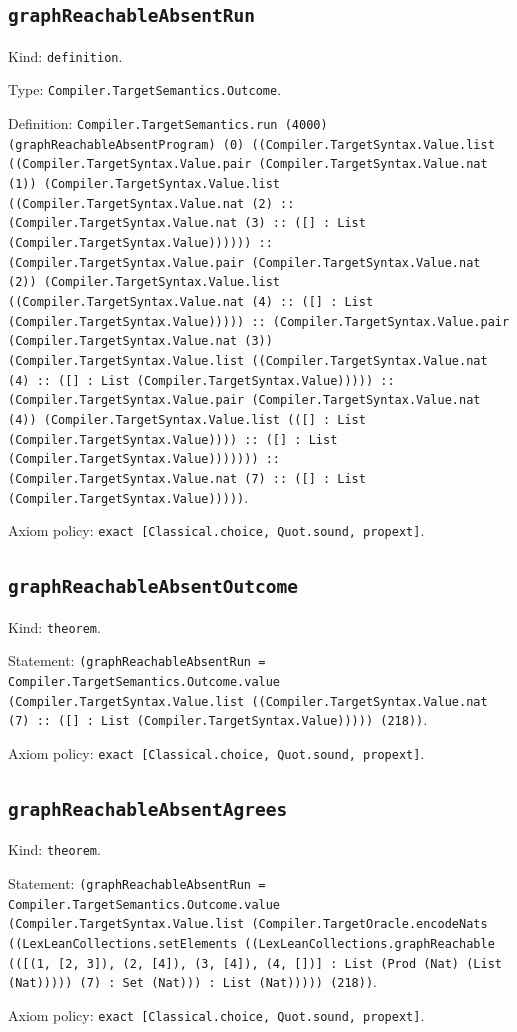 \documentclass[11pt]{article}
\begin{document}
\subsection*{\texttt{graphReachableAbsentRun}}
\noindent Kind: \texttt{definition}.\par
\noindent Type: \texttt{Compiler.TargetSemantics.Outcome}.\par
\noindent Definition: \texttt{Compiler.TargetSemantics.run (4000) (graphReachableAbsentProgram) (0) ((Compiler.TargetSyntax.Value.list ((Compiler.TargetSyntax.Value.pair (Compiler.TargetSyntax.Value.nat (1)) (Compiler.TargetSyntax.Value.list ((Compiler.TargetSyntax.Value.nat (2) :: (Compiler.TargetSyntax.Value.nat (3) :: ([] : List (Compiler.TargetSyntax.Value)))))) :: (Compiler.TargetSyntax.Value.pair (Compiler.TargetSyntax.Value.nat (2)) (Compiler.TargetSyntax.Value.list ((Compiler.TargetSyntax.Value.nat (4) :: ([] : List (Compiler.TargetSyntax.Value))))) :: (Compiler.TargetSyntax.Value.pair (Compiler.TargetSyntax.Value.nat (3)) (Compiler.TargetSyntax.Value.list ((Compiler.TargetSyntax.Value.nat (4) :: ([] : List (Compiler.TargetSyntax.Value))))) :: (Compiler.TargetSyntax.Value.pair (Compiler.TargetSyntax.Value.nat (4)) (Compiler.TargetSyntax.Value.list (([] : List (Compiler.TargetSyntax.Value)))) :: ([] : List (Compiler.TargetSyntax.Value))))))) :: (Compiler.TargetSyntax.Value.nat (7) :: ([] : List (Compiler.TargetSyntax.Value)))))}.\par
\noindent Axiom policy: \texttt{exact [Classical.choice, Quot.sound, propext]}.\par
\subsection*{\texttt{graphReachableAbsentOutcome}}
\noindent Kind: \texttt{theorem}.\par
\noindent Statement: \texttt{(graphReachableAbsentRun = Compiler.TargetSemantics.Outcome.value (Compiler.TargetSyntax.Value.list ((Compiler.TargetSyntax.Value.nat (7) :: ([] : List (Compiler.TargetSyntax.Value))))) (218))}.\par
\noindent Axiom policy: \texttt{exact [Classical.choice, Quot.sound, propext]}.\par
\subsection*{\texttt{graphReachableAbsentAgrees}}
\noindent Kind: \texttt{theorem}.\par
\noindent Statement: \texttt{(graphReachableAbsentRun = Compiler.TargetSemantics.Outcome.value (Compiler.TargetSyntax.Value.list (Compiler.TargetOracle.encodeNats ((LexLeanCollections.setElements ((LexLeanCollections.graphReachable (([(1, [2, 3]), (2, [4]), (3, [4]), (4, [])] : List (Prod (Nat) (List (Nat))))) (7) : Set (Nat))) : List (Nat))))) (218))}.\par
\noindent Axiom policy: \texttt{exact [Classical.choice, Quot.sound, propext]}.\par
\end{document}
